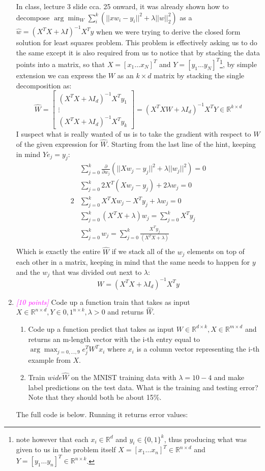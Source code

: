 \documentclass{article}
\newcommand{\argmax}{\arg\!\max}
\newcommand{\argmin}{\arg\!\min}
\newcommand{\field}[1]{\mathbb{#1}}
\newcommand{\1}{\mathbf{1}}
\newcommand{\R}{\field{R}} %
\newcommand{\points}[1]{\small\textcolor{magenta}{\emph{[#1 points]}} \normalsize}
\begin{document}
\begin{enumerate}
    In class, lecture 3 slide cca. 25 onward, it was already shown how to decompose $\argmin_W\sum_i^k (||xw_i-y_i||^2+\lambda ||w||^2_2)$ as a $\hat w = (X^TX+\lambda I)^{-1}X^Ty$ when we were trying to derive the closed form solution for least squares problem. This problem is effectively asking us to do the same except it is also required from us to notice that by stacking the data points into a matrix, so that $X=[x_1 \hdots x_N]^T$ and $Y=[y_1 \hdots y_N]^T$\footnote{note however that each $x_i \in \R^d$ and $y_i\in \{0,1\}^k$, thus producing what was given to us in the problem itself $X=[x_1\hdots x_n]^T\in\R^{n\times d}$ and $Y=[y_1\hdots y_n]^T\in\R^{n\times k}$.}, by simple extension we can express the $W$ as an $k\times d$ matrix by stacking the single decomposition as:
    $$ \widehat W = 
    \begin{bmatrix} 
        (X^TX+\lambda I_d)^{-1}X^Ty_1 \\ 
        \vdots \\ 
        (X^TX+\lambda I_d)^{-1}X^Ty_k
    \end{bmatrix} 
    = (X^TXW+\lambda I_d)^{-1}X^TY \in \R^{k\times d}
    $$
    I suspect what is really wanted of us is to take the gradient with respect to $W$ of the given expression for $\widehat W$. Starting from the last line of the hint, keeping in mind $Ye_j=y_j$: 
    \begin{align*}
        &\sum_{j=0}^k \frac{\partial}{\partial w_j} \left(||Xw_j - y_j||^2 + \lambda ||w_j||^2\right) = 0 \\
        &\sum_{j=0}^k 2X^T(Xw_j - y_j) + 2\lambda w_j = 0 \\
        2&\sum_{j=0}^k X^TXw_j - X^Ty_j + \lambda w_j = 0 \\
        &\sum_{j=0}^k (X^TX + \lambda)w_j = \sum_{j=0}^k X^Ty_j \\
        &\sum_{j=0}^k w_j = \sum_{j=0}^k \frac{X^Ty_j}{(X^TX + \lambda)} \\
    \end{align*}{}
    Which is exactly the entire $\widehat W$ if we stack all of the $w_j$ elements on top of each other in a matrix, keeping in mind that the same needs to happen for $y$ and the $w_j$ that was divided out next to $\lambda$:
    $$W = (X^TX+\lambda I_d)^{-1}X^Ty$$
    
    \newpage
    \item \points{10} Code up a function train that takes as input $X\in\R^{n\times d},Y\in {0,1}^{n\times k},\lambda>0$ and returns $\hat W$.
    \begin{enumerate}
        \item Code up a function predict that takes as input $W\in\R^{d\times k},X\in\R^{m\times d}$ and returns an m-length vector with the i-th entry equal to $\argmax_{j=0,...,9}e^T_jW^Tx_i$ where $x_i$ is a column vector representing the i-th example from $X$.
        \item Train $wide\hat W$ on the MNIST training data with $\lambda = 10-4$ and make label predictions on the test data. What is the training and testing error? Note that they should both be about 15\%.
    \end{enumerate}
    The full code is below. Running it returns error values:
    

\end{enumerate}
\end{document}
